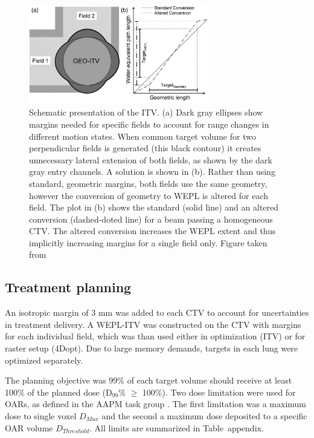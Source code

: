 \begin{figure}[H]
	\begin{center}
		\includegraphics[width=0.7\textwidth]{./ComplexPatients/Images/weplITV.png}
		\caption{Schematic presentation of the ITV. (a) Dark gray ellipses show margins needed for specific fields to account for range changes in different motion states.
		When common target volume for two perpendicular fields is generated (this black contour) it creates unnecessary lateral extension of both fields, as shown by the dark gray
		entry channels. A solution is shown in (b). Rather than using standard, geometric margins, both fields use the same geometry, however the conversion of geometry to WEPL
		is altered for each field. The plot in (b) shows the standard (solid line) and an altered conversion (dashed-doted line) for a beam passing a homogeneous CTV. The altered conversion
		increases the WEPL extent and thus implicitly increasing margins for a single field only. Figure taken from \cite{Graeff2012}}
		\label{Fig:weplITV}
	\end{center}
\end{figure}

\subsection{Treatment planning}

An isotropic margin of 3 mm was added to each CTV to account for uncertainties in treatment delivery. 
A WEPL-ITV was constructed on the CTV with margins for each individual field, which was than used either in optimization (ITV)
or for raster setup (4Dopt). Due to large memory demands, targets in each lung were optimized separately. 
  
The planning objective was 99\% of each target volume should receive at least 100\% of the planned dose (D$_{99}$\% $\geq$ 100\%). Two dose limitation were used for OARs, as defined in 
the AAPM task group \cite{Benedict2010}. The first limitation was a maximum dose to single voxel $D_{Max}$ and the second a maximum dose deposited to a 
specific OAR volume $D_{Threshold}$. All limits are summarized in Table~appendix.
 
